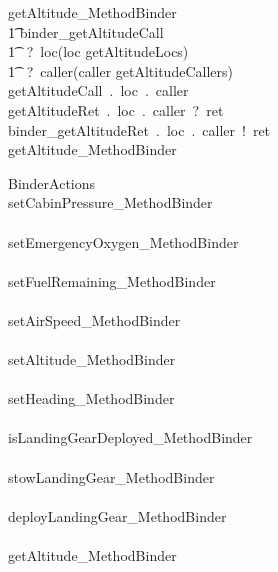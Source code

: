 %
%
\begin{circusaction}
getAltitude\_MethodBinder \circdef \\
	\t1 \circblockopen
	binder\_getAltitudeCall\\ \t1 ~?~loc\prefixcolon(loc \in getAltitudeLocs)\\ \t1 ~?~caller\prefixcolon(caller \in getAltitudeCallers)  \then \\
	getAltitudeCall~.~loc~.~caller  \then \\
	getAltitudeRet~.~loc~.~caller~?~ret \then \\
	binder\_getAltitudeRet~.~loc~.~caller~!~ret  \then \\
	getAltitude\_MethodBinder
	\circblockclose
\end{circusaction}
%
%
\begin{circus}
BinderActions \circdef \\
\circblockopen 
	setCabinPressure\_MethodBinder
	\\ \interleave \\

	setEmergencyOxygen\_MethodBinder
	\\ \interleave \\

	setFuelRemaining\_MethodBinder
	\\ \interleave \\

	setAirSpeed\_MethodBinder
	\\ \interleave \\

	setAltitude\_MethodBinder
	\\ \interleave \\

	setHeading\_MethodBinder
	\\ \interleave \\

	isLandingGearDeployed\_MethodBinder
	\\ \interleave \\

	stowLandingGear\_MethodBinder
	\\ \interleave \\

	deployLandingGear\_MethodBinder
	\\ \interleave \\

	getAltitude\_MethodBinder
	\\ \interleave \\


\end{circus}
